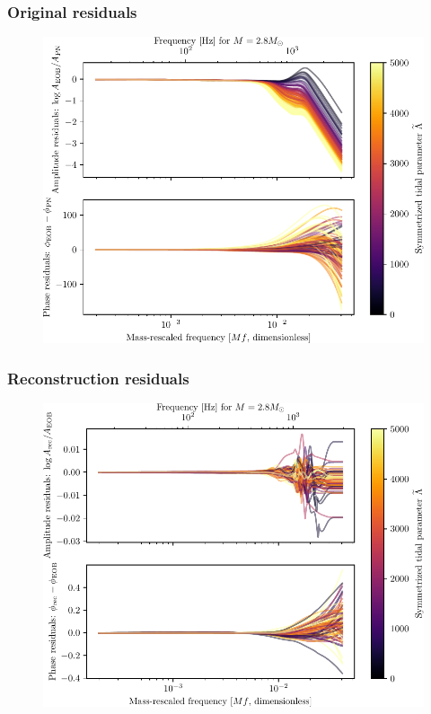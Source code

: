 \documentclass{beamer}
\begin{document}
\begin{frame}
    \frametitle{Original residuals}
    \begin{figure}[ht]
    \centering
    \includegraphics[width=.85\textwidth]{figures/original_residuals}
    \label{fig:original_residuals}
    \end{figure}
\end{frame}


\begin{frame}
    \frametitle{Reconstruction residuals}
    \begin{figure}[ht]
    \centering
    \includegraphics[width=.85\textwidth]{figures/reconstruction_residuals}
    \label{fig:reconstruction_residuals}
    \end{figure}
\end{frame}
\end{document}

